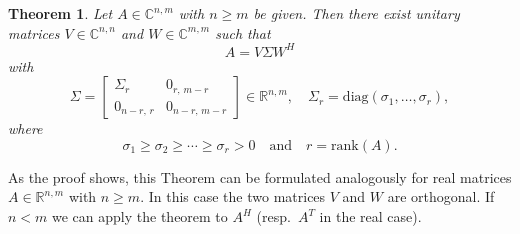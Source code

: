 \documentclass{article}
\newtheorem{theorem}{Theorem}[section] %
\begin{document}
\vspace{1cm}

\begin{theorem}
Let $A \in \mathbb{C}^{n,m}$ with $n \ge m$ be given.  
Then there exist unitary matrices  
$V \in \mathbb{C}^{n,n}$ and $W \in \mathbb{C}^{m,m}$ such that  
\[
A = V \Sigma W^H
\]
with
\[
\Sigma =
\begin{bmatrix}
\Sigma_r & 0_{r,\,m-r} \\
0_{n-r,\,r} & 0_{n-r,\,m-r}
\end{bmatrix}
\in \mathbb{R}^{n,m},
\quad
\Sigma_r = \mathrm{diag}(\sigma_1, \dots, \sigma_r),
\]
where
\[
\sigma_1 \ge \sigma_2 \ge \cdots \ge \sigma_r > 0
\quad\text{and}\quad
r = \mathrm{rank}(A).
\]
\end{theorem}

\vspace{1cm}

As the proof shows, this Theorem can be formulated analogously for real matrices 
$A \in \mathbb{R}^{n,m}$ with $n \geq m$. In this case the two matrices $V$ and $W$ 
are orthogonal. If $n < m$ we can apply the theorem to $A^H$ (resp.\ $A^T$ in the real case).


\vspace{1cm}
\end{document}
